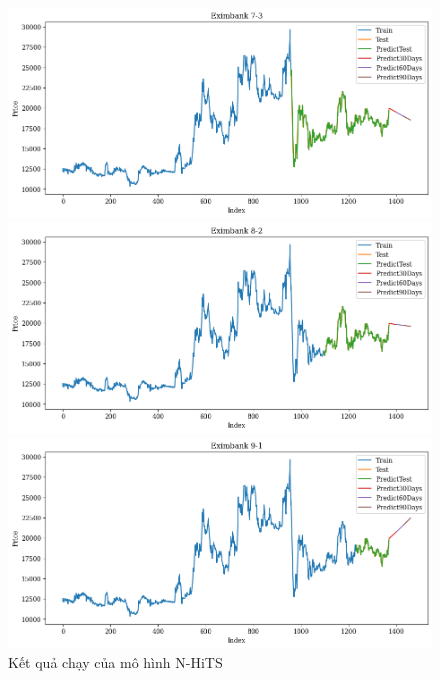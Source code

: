 \begin{figure}[H]
\begin{minipage}{0.15\textwidth}
    \end{minipage}
    \hfill
    \begin{minipage}{0.15\textwidth}
    \centering
    \includegraphics[width=1\textwidth]{resources/chapter-5/newdata1/result/EIB_N-HiTS_7-3.png}
    \end{minipage}
    \hfill
    \begin{minipage}{0.15\textwidth}
    \centering
    \includegraphics[width=1\textwidth]{resources/chapter-5/newdata1/result/EIB_N-HiTS_8-2.png}
    \end{minipage}
    \hfill
        \begin{minipage}{0.15\textwidth}
    \centering
    \includegraphics[width=1\textwidth]{resources/chapter-5/newdata1/result/EIB_N-HiTS_9-1.png}
    \end{minipage}
    \hfill
    
    \caption{Kết quả chạy của mô hình N-HiTS}
    \label{fig:n-hits_result}
\end{figure}


